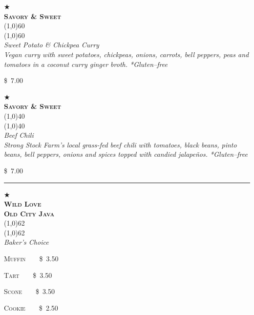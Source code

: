\documentclass[letterpaper, 12pt]{article}%
\newcommand{\menuitem}[4]{
 \centering
  $\bigstar$\\
  \bigskip
  \textbf{\sffamily \textsc{\large#2}}\vspace{-1ex}\\
  \line(1,0){#1}\vspace{-2ex}\\
  \line(1,0){#1}\vspace{0.5ex}\\
  \smallskip
  \emph{\footnotesize#3}\\
  \vspace*{\fill}
  {\small#4}
}
\newcommand{\flowtherefore}{~~\raisebox{0.2ex}{$\therefore$}~~}
\newcommand{\price}[2]{
 \textsc{\small#1}\flowtherefore\$~\textsc{\small#2}
}
\newcommand{\varprice}[1]{
 \$~\textsc{\small#1}
}
\begin{document}
{\centering
\begin{minipage}{0.5\textwidth}
{\centering
\begin{minipage}[t][\ssmini][b]{2.5\ssmini}
 \centering
 \menuitem{60}{
  Savory \& Sweet}{
  \textup{\normalsize Sweet Potato \& Chickpea Curry}\\
  Vegan curry with sweet potatoes, chickpeas, onions, carrots, bell peppers, peas and tomatoes in a coconut curry ginger broth. *Gluten--free
  }{
  \varprice{7.00}
 }
\end{minipage}

\rule{0pt}{0.5em}

\begin{minipage}[t][\ssmini][b]{2.5\ssmini}
 \centering
 \menuitem{40}{
  Savory \& Sweet}{
  \textup{\normalsize Beef Chili}\\
  Strong Stock Farm's local grass-fed beef chili with tomatoes, black beans, pinto beans, bell peppers, onions and spices topped with candied jalape\~{n}os. *Gluten--free
  }{
  \varprice{7.00}
 }
\end{minipage}

}
\end{minipage}
\rule{2em}{0pt}
\begin{minipage}{0.3\textwidth}
{\centering
\begin{minipage}{\ssmini}
 \menuitem{62}{Wild Love\\Old City Java}{
  \textup{\normalsize Baker's Choice}\vspace{1ex}
  }{
  \price{Muffin}{3.50}
  
  \price{Tart}{3.50}
  
  \price{Scone}{3.50}
  
  \price{Cookie}{2.50}
 }
\end{minipage}

}
\end{minipage}

}


\begin{minipage}{\textwidth}
\end{minipage}
\clearpage
\end{document}
